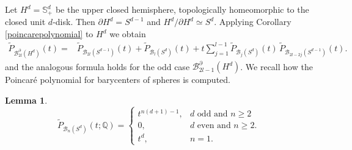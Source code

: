 \documentclass[11pt,a4paper]{article}
\numberwithin{equation}{section}
\newtheorem{lem}[thm]{Lemma}
\theoremstyle{definition}
\theoremstyle{remark}
\newcommand{\Q}{\mathbb{Q}}
\newcommand{\pa}{\partial}
\newcommand{\wt}{\widetilde}
\newcommand{\BB}{\mathcal B}
\begin{document}
Let \(H^d=\mathbb S^d_+\) be the upper closed hemisphere, topologically homeomorphic to the closed unit \(d\)-disk.  Then \(\pa H^d=S^{d-1}\) and \(H^d/\pa H^d\simeq S^d\).
Applying Corollary 
\ref{poincarepolynomial} to $H^d$ we obtain  
\begin{equation}\label{poincareholed}
\begin{aligned}
\widetilde P_{\BB_{2l}^{\partial}(H^d)}(t)
={}&
\widetilde P_{\BB_{2l}(S^{d-1})}(t)
+
\widetilde P_{\BB_l(S^d)}(t)+
t\sum_{j=1}^{l-1}
\widetilde P_{\BB_j(S^d)}(t)\,
\widetilde P_{\BB_{2l-2j}(S^{d-1})}(t).
\end{aligned}
\end{equation}
and the analogous formula holds for the odd case $\BB_{2l-1}^\pa (H^d)$. 
We recall how the Poincar\'e polynomial for barycenters of spheres is computed.

\begin{lem}\label{poincarebarycenterspheres}
\[
\wt P_{\BB_n(S^d)}(t;\Q)=
\begin{cases}
t^{n(d+1)-1},& d\text{ odd and } n\ge 2\\
0,& d\text{ even and }n\ge2.\\
t^d,& n=1.
\end{cases}
\] 
\end{lem}
\end{document}
